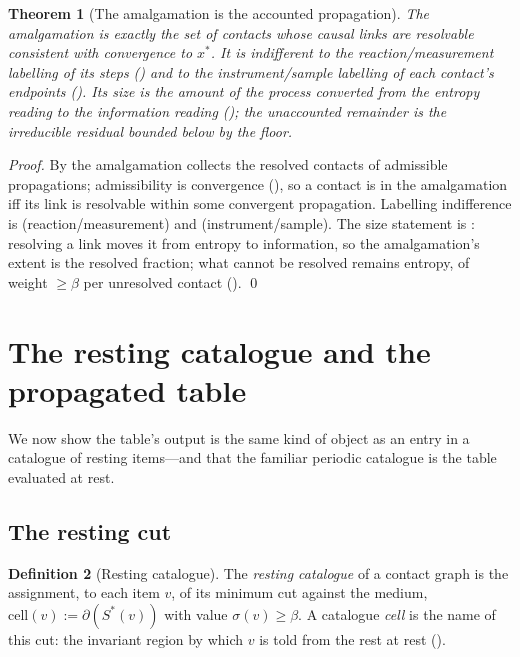 \documentclass[11pt,twocolumn,a4paper]{article}
\theoremstyle{thmstyle}
\newtheorem{theorem}{Theorem}[section]
\theoremstyle{definition}
\newtheorem{definition}[theorem]{Definition}
\theoremstyle{remark}
\newcommand{\flo}{\beta}                 %
\newcommand{\cut}{\partial}              %
\newcommand{\str}{\sigma}                %
\begin{document}
\begin{theorem}[The amalgamation is the accounted propagation]
\label{thm:amalgamation}
The amalgamation is exactly the set of contacts whose causal links are
resolvable consistent with convergence to $x^{\ast}$. It is indifferent to
the reaction/measurement labelling of its steps
() and to the instrument/sample labelling
of each contact's endpoints (). Its size is the amount
of the process converted from the entropy reading to the information
reading (); the unaccounted remainder is the
irreducible residual bounded below by the floor.
\end{theorem}

\begin{proof}
By  the amalgamation collects the resolved contacts
of admissible propagations; admissibility is convergence
(), so a contact is in the amalgamation iff its
link is resolvable within some convergent propagation. Labelling
indifference is  (reaction/measurement) and
 (instrument/sample). The size statement is
: resolving a link moves it from entropy to
information, so the amalgamation's extent is the resolved fraction; what
cannot be resolved remains entropy, of weight $\ge\flo$ per unresolved
contact (). \qed
\end{proof}

\section{The resting catalogue and the propagated table}
\label{sec:catalogue}

We now show the table's output is the same kind of object as an entry in a
catalogue of resting items---and that the familiar periodic catalogue is
the table evaluated at rest.

\subsection{The resting cut}

\begin{definition}[Resting catalogue]
\label{def:catalogue}
The \emph{resting catalogue} of a contact graph is the assignment, to each
item $v$, of its minimum cut against the medium,
$\mathrm{cell}(v):=\cut(S^{\ast}(v))$ with value $\str(v)\ge\flo$. A
catalogue \emph{cell} is the name of this cut: the invariant region by
which $v$ is told from the rest at rest ().
\end{definition}
\end{document}
